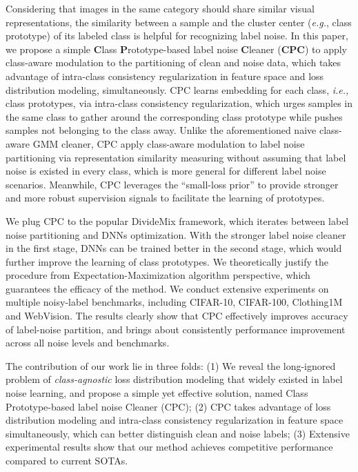 \documentclass{article} \usepackage{iclr2023_conference,times}
\begin{document}
Considering that images in the same category should share similar visual representations, the similarity between a sample and the cluster center (\emph{e.g.}, class prototype) of its labeled class is helpful for recognizing label noise. In this paper, we propose a simple \textbf{C}lass \textbf{P}rototype-based label noise \textbf{C}leaner (\textbf{CPC}) to apply class-aware modulation to the partitioning of clean and noise data, which takes advantage of intra-class consistency regularization in feature space and loss distribution modeling, simultaneously. CPC learns embedding for each class, \emph{i.e.,} class prototypes, via intra-class consistency regularization, which urges samples in the same class to gather around the corresponding class prototype while pushes samples not belonging to the class away.
Unlike the aforementioned naive class-aware GMM cleaner, CPC apply class-aware modulation to label noise partitioning via representation similarity measuring without assuming that label noise is existed in every class, which is more general for different label noise scenarios. Meanwhile, CPC leverages the ``small-loss prior'' to provide stronger and more robust supervision signals to facilitate the learning of prototypes. 


We plug CPC to the popular DivideMix\citep{Li2020DivideMixLW} framework, which iterates between label noise partitioning and DNNs optimization. With the stronger label noise cleaner in the first stage, DNNs can be trained better in the second stage, which would further improve the learning of class prototypes. We theoretically justify the procedure from Expectation-Maximization algorithm perspective, which guarantees the efficacy of the method. We conduct extensive experiments on multiple noisy-label benchmarks, including CIFAR-10, CIFAR-100, Clothing1M and WebVision. The results clearly show that CPC effectively improves accuracy of label-noise partition, and brings about consistently performance improvement across all noise levels and benchmarks. 

The contribution of our work lie in three folds: (1) We reveal the long-ignored problem of \emph{class-agnostic} loss distribution modeling that widely existed in label noise learning, and propose a simple yet effective solution, named  Class Prototype-based label noise Cleaner (CPC); (2) CPC takes advantage of loss distribution modeling and intra-class consistency regularization in feature space simultaneously, which can  better distinguish clean and noise labels; (3) Extensive experimental results show that our method achieves competitive performance compared to current SOTAs. 
\end{document}
